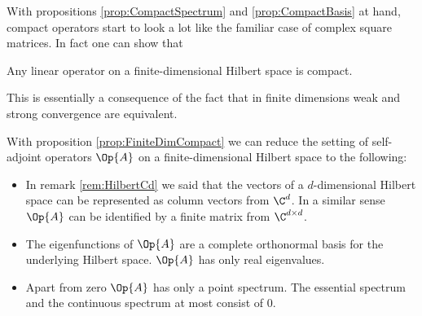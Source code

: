 With propositions \ref{prop:CompactSpectrum} and \ref{prop:CompactBasis}
at hand, compact operators start to look a lot like the familiar case
of complex square matrices.
In fact one can show that~\cite[p.~43]{Helffer2013}
\begin{prop}
	\label{prop:FiniteDimCompact}
	Any linear operator on a finite-dimensional Hilbert space is compact.
\end{prop}
This is essentially a consequence of the fact that in finite dimensions
weak and strong convergence are equivalent.

\begin{rem}
With proposition \ref{prop:FiniteDimCompact}
we can reduce the setting of self-adjoint operators $\Op{A}$ on a finite-dimensional
Hilbert space to the following:
\begin{itemize}
	\item In remark \vref{rem:HilbertCd} we said that the vectors
		of a $d$-dimensional Hilbert space
		can be represented as column vectors from $\C^d$.
		In a similar sense $\Op{A}$ can be identified by a finite matrix from
		$\C^{d \times d}$.
	\item The eigenfunctions of $\Op{A}$ are a complete orthonormal
		basis for the underlying Hilbert space.
		$\Op{A}$ has only real eigenvalues.
	\item Apart from zero $\Op{A}$ has only a point spectrum.
		The essential spectrum and the continuous spectrum at most consist of $0$.
\end{itemize}
\end{rem}


